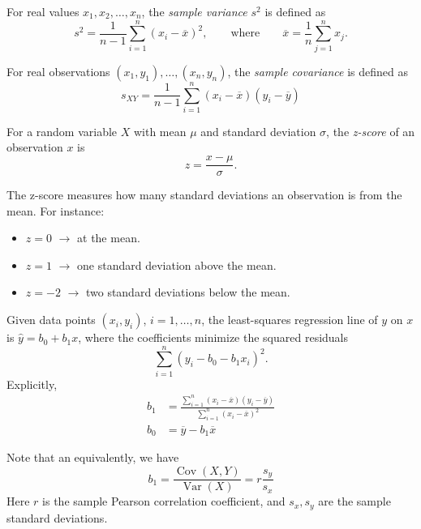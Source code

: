 \begin{df}
For real values $x_1,x_2,\ldots,x_n$, the \emph{sample variance} $s^2$ is defined as
\[
s^2
=
\frac{1}{n-1}\sum_{i=1}^{n}
\left(x_i-\overline{x}\right)^2,
\qquad
\text{where}
\qquad
\overline{x}
=
\frac{1}{n}\sum_{j=1}^{n}x_j.
\]
\end{df}

\begin{df}
For real observations $(x_1, y_1), \dots, (x_n, y_n)$, the \emph{sample covariance} is defined as 
\[
s_{XY} = \frac{1}{n - 1} \sum_{i = 1}^n (x_i - \overline{x})(y_i - \overline{y})
\]
\end{df}

\begin{df}
For a random variable $X$ with mean $\mu$ and standard deviation $\sigma$, the
\emph{z-score} of an observation $x$ is
\[
z=\frac{x-\mu}{\sigma}.
\]
\end{df}

\begin{remark}
The z-score measures how many standard deviations an observation is from the mean.
For instance:
\begin{itemize}
    \item $z=0$ $\rightarrow$ at the mean.
    \item $z=1$ $\rightarrow$ one standard deviation above the mean.
    \item $z=-2$ $\rightarrow$ two standard deviations below the mean.
\end{itemize}
\end{remark}

\begin{theorem}
Given data points $(x_i,y_i)$, $i=1,\ldots,n$, the least-squares regression
line of $y$ on $x$ is $\hat{y} = b_0 + b_1 x$, where the coefficients minimize 
the squared residuals
\[
\sum_{i=1}^n(y_i-b_0-b_1x_i)^2.
\]
Explicitly,
\begin{align*}
b_1&= \frac{\sum_{i=1}^n(x_i-\overline x) (y_i-\overline y)} {\sum_{i=1}^n(x_i-\overline x)^2} \\
b_0 &= \overline y-b_1\overline x
\end{align*}
\end{theorem}

\begin{remark}
Note that an equivalently, we have 
\[
b_1=
\frac{\operatorname{Cov}(X,Y)}
{\operatorname{Var}(X)}
=r\frac{s_y}{s_x}
\]
Here $r$ is the sample Pearson correlation coefficient, and $s_x,s_y$ are the sample
standard deviations.
\end{remark}

